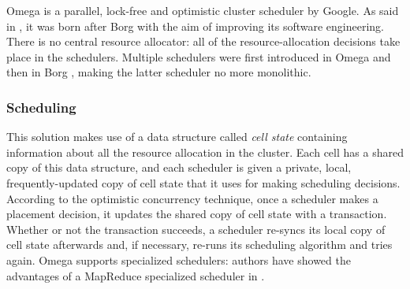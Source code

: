 Omega \cite{omega} is a parallel, lock-free and optimistic cluster scheduler by Google.
As said in \cite{borgomegakubernetes}, it was born after Borg \cite{borg} with the aim of improving its software engineering.
There is no central resource allocator: all of the resource-allocation decisions take place in the schedulers.
Multiple schedulers were first introduced in Omega \cite{omega} and then in Borg \cite{borg}, making the latter scheduler no more monolithic.

\subsubsection{Scheduling}
This solution makes use of a data structure called \textit{cell state} containing information about all the resource allocation in the cluster.
Each cell has a shared copy of this data structure, and each scheduler is given a private, local, frequently-updated copy of cell state that it uses for making scheduling decisions.
According to the optimistic concurrency technique, once a scheduler makes a placement decision, it updates the shared copy of cell state with a transaction.
Whether or not the transaction succeeds, a scheduler re-syncs its local copy of cell state afterwards and, if necessary, re-runs its scheduling algorithm and tries again.
Omega \cite{omega} supports specialized schedulers: authors have showed the advantages of a MapReduce \cite{mapreduce} specialized scheduler in \cite{omega}.

